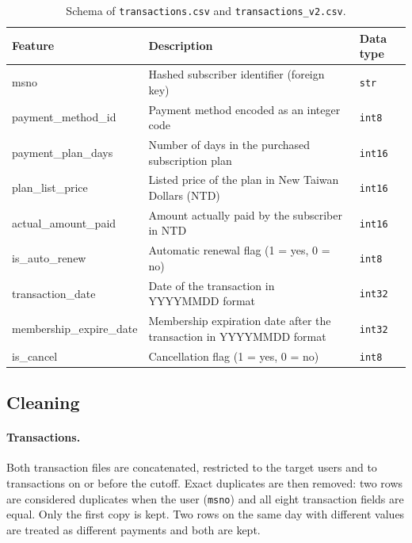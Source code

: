 \documentclass{article}
\begin{document}
\begin{table}[H]
\centering
\renewcommand{\arraystretch}{1.3}
\begin{tabularx}{\textwidth}{|l|X|l|}
\hline
\textbf{Feature} & \textbf{Description} & \textbf{Data type} \\ \hline
msno                     & Hashed subscriber identifier (foreign key) & \texttt{str} \\ \hline
payment\_method\_id      & Payment method encoded as an integer code & \texttt{int8} \\ \hline
payment\_plan\_days      & Number of days in the purchased subscription plan & \texttt{int16} \\ \hline
plan\_list\_price        & Listed price of the plan in New Taiwan Dollars (NTD) & \texttt{int16} \\ \hline
actual\_amount\_paid     & Amount actually paid by the subscriber in NTD & \texttt{int16} \\ \hline
is\_auto\_renew          & Automatic renewal flag (1 = yes, 0 = no) & \texttt{int8} \\ \hline
transaction\_date        & Date of the transaction in YYYYMMDD format & \texttt{int32} \\ \hline
membership\_expire\_date & Membership expiration date after the transaction in YYYYMMDD format & \texttt{int32} \\ \hline
is\_cancel               & Cancellation flag (1 = yes, 0 = no) & \texttt{int8} \\ \hline
\end{tabularx}
\caption{Schema of \texttt{transactions.csv} and \texttt{transactions\_v2.csv}.}
\label{tab:w2_schema_transactions}
\end{table}

\subsection{Cleaning}

\paragraph{Transactions.} Both transaction files are concatenated, restricted to the target users and to transactions on or before the cutoff. Exact duplicates are then removed: two rows are considered duplicates when the user (\texttt{msno}) and all eight transaction fields are equal. Only the first copy is kept. Two rows on the same day with different values are treated as different payments and both are kept.
\end{document}
